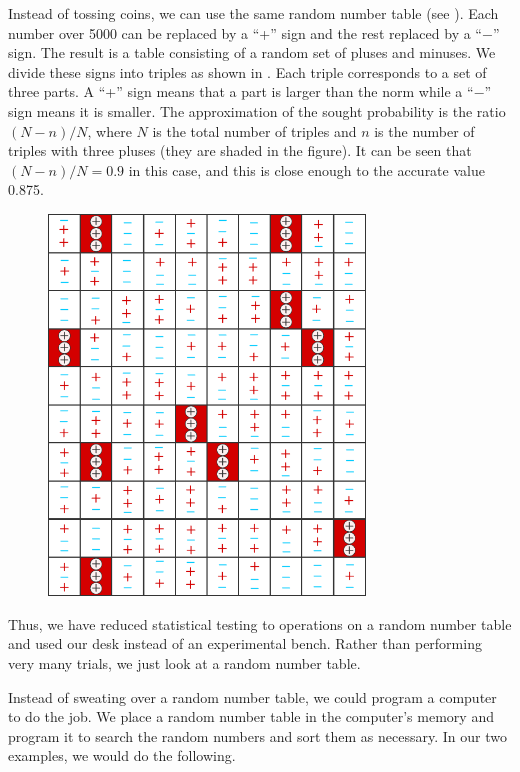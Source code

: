  Instead of tossing coins, we can use the same random
number table (see ). Each number over \num{5000} can be replaced by a ``+'' sign and the rest replaced by a ``$-$'' sign. The result is a table
consisting of a random set of pluses and minuses. We divide these signs
into triples as shown in . Each triple corresponds to a set of three parts. A ``+'' sign means that a part is larger than the norm while
a ``$-$'' sign means it is smaller. The approximation of the sought
probability is the ratio $(N - n)/N$, where $N$ is the total number of triples
and $n$ is the number of triples with three pluses (they are shaded in the
figure). It can be seen that $(N - n)/N = 0.9$ in this case, and this is close
enough to the accurate value 0.875.
 \begin{figure}[!h]
 \centering
 \includegraphics[width=0.75\textwidth]{figures/monte-carlo3.pdf}
 \end{figure}

Thus, we have reduced statistical testing to operations on a random
number table and used our desk instead of an experimental bench.
Rather than performing very many trials, we just look at a random
number table.

 Instead of sweating over a random
number table, we could program a computer to do the job. We place
a random number table in the computer's memory and program it to
search the random numbers and sort them as necessary. In our two
examples, we would do the following.

